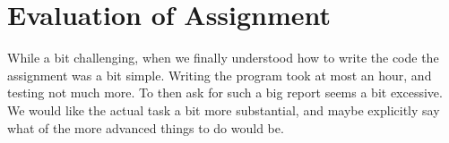 \section{Evaluation of Assignment}

While a bit challenging, when we finally understood how to write the code the assignment was a bit simple.
Writing the program took at most an hour, and testing not much more.
To then ask for such a big report seems a bit excessive.
We would like the actual task a bit more substantial, and maybe explicitly say what of the more advanced things to do would be.

